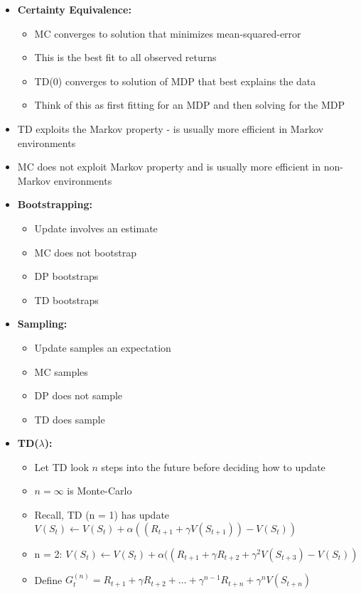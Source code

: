 \documentclass[12pt]{article}
\begin{document}
\begin{itemize}
\begin{itemize}
      \item \textbf{Certainty Equivalence:}
      \begin{itemize}
        \item MC converges to solution that minimizes mean-squared-error
        \item This is the best fit to all observed returns
        \item TD(0) converges to solution of MDP that best explains the data
        \item Think of this as first fitting for an MDP and then solving for the MDP
      \end{itemize}
      \item TD exploits the Markov property - is usually more efficient in Markov environments
      \item MC does not exploit Markov property and is usually more efficient in non-Markov environments
      \item \textbf{Bootstrapping:}
      \begin{itemize}
        \item Update involves an estimate
        \item MC does not bootstrap
        \item DP bootstraps
        \item TD bootstraps
      \end{itemize}
      \item \textbf{Sampling:}
      \begin{itemize}
        \item Update samples an expectation
        \item MC samples
        \item DP does not sample
        \item TD does sample
      \end{itemize}
      \item \textbf{TD($\lambda$):}
      \begin{itemize}
        \item Let TD look $n$ steps into the future before deciding how to update
        \item $n = \infty$ is Monte-Carlo
        \item Recall, TD (n = 1) has update $V(S_t) \leftarrow V(S_t) + \alpha((R_{t+1} + \gamma V(S_{t+1})) - V(S_t))$ 
        \item n = 2: $V(S_t) \leftarrow V(S_t) + \alpha((R_{t+1} + \gamma R_{t+2} + \gamma^2V(S_{t+3}) - V(S_t))$
        \item Define $G^{(n)}_t = R_{t+1} + \gamma R_{t+2} + \dots + \gamma^{n-1}R_{t+n} + \gamma^nV(S_{t + n})$

\end{itemize}
\end{itemize}
\end{itemize}
\end{document}
